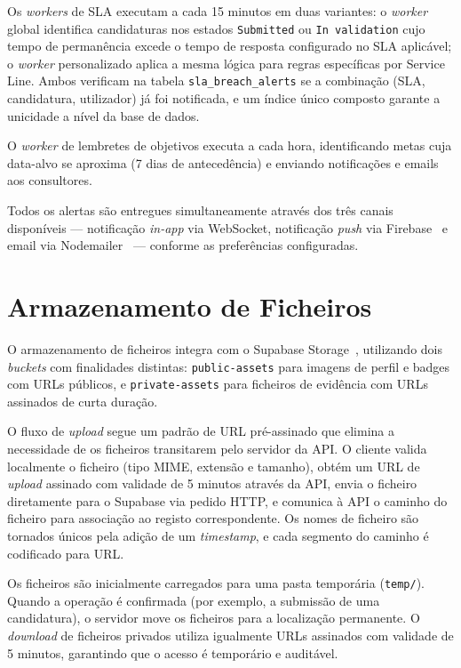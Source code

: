 \documentclass[12pt,a4paper]{report}
\begin{document}
Os \textit{workers} de SLA executam a cada 15 minutos em duas variantes: o \textit{worker} global identifica candidaturas nos estados \texttt{Submitted} ou \texttt{In validation} cujo tempo de permanência excede o tempo de resposta configurado no SLA aplicável; o \textit{worker} personalizado aplica a mesma lógica para regras específicas por Service Line. Ambos verificam na tabela \texttt{sla\_breach\_alerts} se a combinação (SLA, candidatura, utilizador) já foi notificada, e um índice único composto garante a unicidade a nível da base de dados.

O \textit{worker} de lembretes de objetivos executa a cada hora, identificando metas cuja data-alvo se aproxima (7 dias de antecedência) e enviando notificações e emails aos consultores.

Todos os alertas são entregues simultaneamente através dos três canais disponíveis --- notificação \textit{in-app} via WebSocket, notificação \textit{push} via Firebase~\cite{firebase} e email via Nodemailer~\cite{nodemailer} --- conforme as preferências configuradas.

\section{Armazenamento de Ficheiros}

O armazenamento de ficheiros integra com o Supabase Storage~\cite{supabase}, utilizando dois \textit{buckets} com finalidades distintas: \texttt{public-assets} para imagens de perfil e badges com URLs públicos, e \texttt{private-assets} para ficheiros de evidência com URLs assinados de curta duração.

O fluxo de \textit{upload} segue um padrão de URL pré-assinado que elimina a necessidade de os ficheiros transitarem pelo servidor da API. O cliente valida localmente o ficheiro (tipo MIME, extensão e tamanho), obtém um URL de \textit{upload} assinado com validade de 5 minutos através da API, envia o ficheiro diretamente para o Supabase via pedido HTTP, e comunica à API o caminho do ficheiro para associação ao registo correspondente. Os nomes de ficheiro são tornados únicos pela adição de um \textit{timestamp}, e cada segmento do caminho é codificado para URL.

Os ficheiros são inicialmente carregados para uma pasta temporária (\texttt{temp/}). Quando a operação é confirmada (por exemplo, a submissão de uma candidatura), o servidor move os ficheiros para a localização permanente. O \textit{download} de ficheiros privados utiliza igualmente URLs assinados com validade de 5 minutos, garantindo que o acesso é temporário e auditável.
\end{document}
